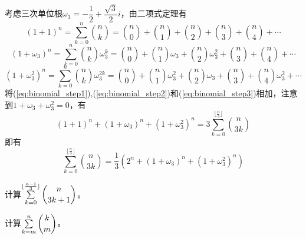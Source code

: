                 \begin{solution}
                    考虑三次单位根$\omega_{3}=-\dfrac12+\dfrac{\sqrt{3}}{2}i$，由二项式定理有
                    \begin{equation}
                        \label{eq:binomial_step1}
                        (1+1)^n=\sum_{k=0}^n\binom{n}{k}=\binom{n}{0}+\binom{n}{1}+\binom{n}{2}+\binom{n}{3}+\binom{n}{4}+\cdots
                    \end{equation}
                    \begin{equation}
                        \label{eq:binomial_step2}
                        (1+\omega_{3})^n=\sum_{k=0}^n\binom{n}{k}\omega_{3}^{k}=\binom{n}{0}+\binom{n}{1}\omega_{3}+\binom{n}{2}\omega_{3}^{2}+\binom{n}{3}+\binom{n}{4}+\cdots
                    \end{equation}
                    \begin{equation}
                        \label{eq:binomial_step3}
                        (1+\omega_{3}^{2})^n=\sum_{k=0}^n\binom{n}{k}\omega_{3}^{2k}= \binom{n}{0}+\binom{n}{1}\omega_{3}^{2}+\binom{n}{2}\omega_{3}+\binom{n}{3}+\binom{n}{4}\omega_{3}^{2}+\cdots
                    \end{equation}
                    将(\ref{eq:binomial_step1}),(\ref{eq:binomial_step2})和(\ref{eq:binomial_step3})相加，注意到$1+\omega_{3}+\omega_{3}^{2}=0$，有
                    \begin{equation}
                        \label{eq:binomial_step4}
                        (1+1)^n+(1+\omega_{3})^n+(1+\omega_{3}^{2})^n=3\sum_{k=0}^{\lfloor \frac{n}{3} \rfloor}\binom{n}{3k}
                        \nonumber
                    \end{equation}
                    即有
                    \begin{equation}
                        \label{eq:binomial_step5}
                        \sum_{k=0}^{\lfloor \frac{n}{3} \rfloor}\binom{n}{3k}=\frac13(2^n+(1+\omega_{3})^n+(1+\omega_{3}^{2})^n)
                        \nonumber
                    \end{equation}
                \end{solution}

                \begin{exercise}
                    计算$\sum\limits_{k=0}^{\lfloor \frac{n-1}{3} \rfloor}\dbinom{n}{3k+1}$。
                \end{exercise}

                \begin{example}
                    \label{example:binomial}
                    计算$\sum\limits_{k=m}^n\dbinom{k}{m}$。
                \end{example}

